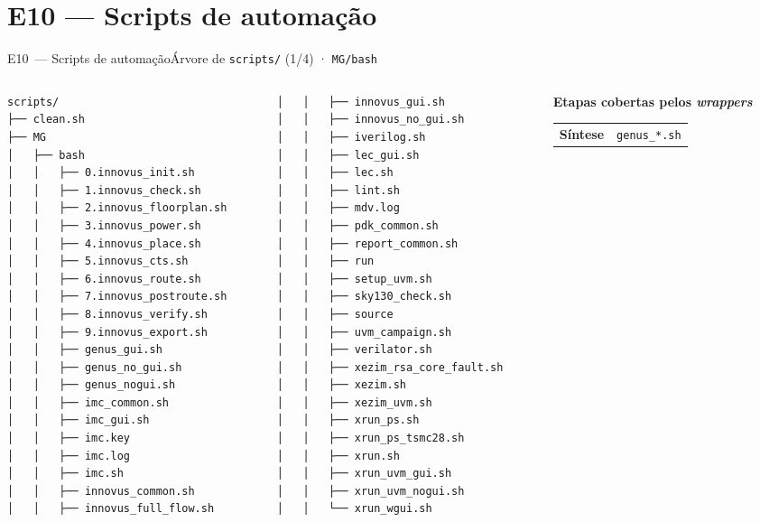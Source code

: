 \documentclass[aspectratio=169,10pt,t]{beamer}
\newcommand{\tmTree}{\fontsize{5.2}{6.1}\selectfont}
\begin{document}
\section{E10 — Scripts de automação}
\begin{frame}[fragile]{E10~— Scripts de automação}{Árvore de \texttt{scripts/} (1/4) · \texttt{MG/bash}}
  \vspace*{-0.3cm}
  \begin{columns}[T]
    \begin{column}{0.30\textwidth}
\tmTree
\begin{verbatim}
scripts/
├── clean.sh
├── MG
│   ├── bash
│   │   ├── 0.innovus_init.sh
│   │   ├── 1.innovus_check.sh
│   │   ├── 2.innovus_floorplan.sh
│   │   ├── 3.innovus_power.sh
│   │   ├── 4.innovus_place.sh
│   │   ├── 5.innovus_cts.sh
│   │   ├── 6.innovus_route.sh
│   │   ├── 7.innovus_postroute.sh
│   │   ├── 8.innovus_verify.sh
│   │   ├── 9.innovus_export.sh
│   │   ├── genus_gui.sh
│   │   ├── genus_no_gui.sh
│   │   ├── genus_nogui.sh
│   │   ├── imc_common.sh
│   │   ├── imc_gui.sh
│   │   ├── imc.key
│   │   ├── imc.log
│   │   ├── imc.sh
│   │   ├── innovus_common.sh
│   │   ├── innovus_full_flow.sh
\end{verbatim}
    \end{column}
    \begin{column}{0.30\textwidth}
\tmTree
\begin{verbatim}
│   │   ├── innovus_gui.sh
│   │   ├── innovus_no_gui.sh
│   │   ├── iverilog.sh
│   │   ├── lec_gui.sh
│   │   ├── lec.sh
│   │   ├── lint.sh
│   │   ├── mdv.log
│   │   ├── pdk_common.sh
│   │   ├── report_common.sh
│   │   ├── run
│   │   ├── setup_uvm.sh
│   │   ├── sky130_check.sh
│   │   ├── source
│   │   ├── uvm_campaign.sh
│   │   ├── verilator.sh
│   │   ├── xezim_rsa_core_fault.sh
│   │   ├── xezim.sh
│   │   ├── xezim_uvm.sh
│   │   ├── xrun_ps.sh
│   │   ├── xrun_ps_tsmc28.sh
│   │   ├── xrun.sh
│   │   ├── xrun_uvm_gui.sh
│   │   ├── xrun_uvm_nogui.sh
│   │   └── xrun_wgui.sh
\end{verbatim}
    \end{column}
    \begin{column}{0.36\textwidth}
      \scriptsize
      \textbf{\color{tmCafe}Etapas cobertas pelos \emph{wrappers}}\\[0.1cm]
      \renewcommand{\arraystretch}{1.1}
      \begin{tabularx}{\linewidth}{@{}>{\bfseries}l >{\raggedright\arraybackslash}X@{}}
        \toprule
        Síntese & \texttt{genus\_*.sh} \\

\end{tabularx}
\end{column}
\end{columns}
\end{frame}
\end{document}
